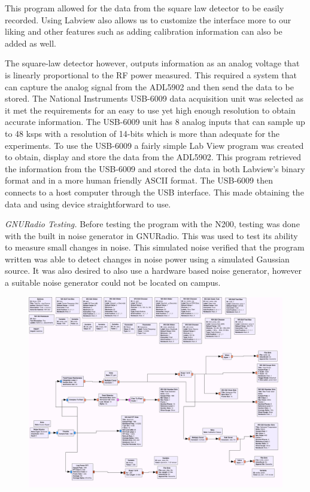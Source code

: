 This program allowed for the data from the square law detector to be easily recorded.  Using Labview also allows us to customize the interface more to our liking and other features such as adding calibration information can also be added as well.  

The square-law detector however, outputs information as an analog voltage that is linearly proportional to the RF power measured.  This required a system that can capture the analog signal from the ADL5902 and then send the data to be stored.  The National Instruments USB-6009 data acquisition unit was selected as it met the requirements for an easy to use yet high enough resolution to obtain accurate information.  The USB-6009 unit has 8 analog inputs that can sample up to 48 ksps with a resolution of 14-bits which is more than adequate for the experiments.  To use the USB-6009 a fairly simple Lab View program was created to obtain, display and store the data from the ADL5902.  This program retrieved the information from the USB-6009 and stored the data in both Labview's binary format and in a more human friendly ASCII format.  The USB-6009 then connects to a host computer through the USB interface.  This made obtaining the data and using device straightforward to use.

\emph{GNURadio Testing.  }Before testing the program with the N200, testing was done with the built in noise generator in GNURadio.  This was used to test its ability to measure small changes in noise.  This simulated noise verified that the program written was able to detect changes in noise power using a simulated Gaussian source.  It was also desired to also use a hardware based noise generator, however a suitable noise generator could not be located on campus.

{\begin{figure}[h!tb] \centering
\includegraphics[width=\textwidth]{Images/noisesrc_radiometer.png}
\label{noise_test}
\end{figure}
}


